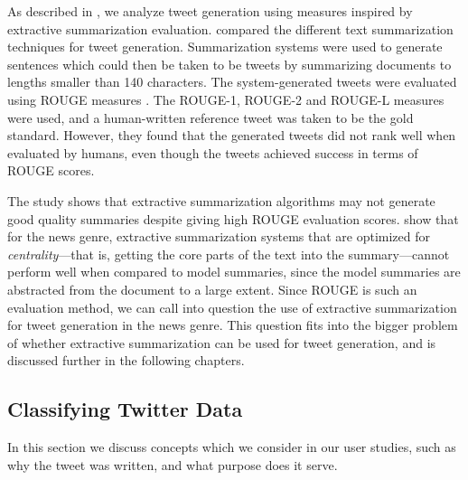 As described in , we analyze tweet generation using measures inspired by extractive summarization evaluation. \cite{lloret2013towards} compared the different text summarization techniques for tweet generation. Summarization systems were used to generate sentences which could then be taken to be tweets by summarizing documents to lengths smaller than 140 characters. The system-generated tweets were evaluated using ROUGE measures \citep{lin2004rouge}. The ROUGE-1, ROUGE-2 and ROUGE-L measures were used, and a human-written reference tweet was taken to be the gold standard. However, they found that the generated tweets did not rank well when evaluated by humans, even though the tweets achieved success in terms of ROUGE scores. %

The \cite{lloret2013towards} study shows that extractive summarization algorithms may not generate good quality summaries despite giving high ROUGE evaluation scores. \cite{cheung2013towards} show that for the news genre, extractive summarization systems that are optimized for \textit{centrality}---that is, getting the core parts of the text into the summary---cannot perform well when compared to model summaries, since the model summaries are abstracted from the document to a large extent. Since ROUGE is such an evaluation method, we can call into question the use of extractive summarization for tweet generation in the news genre. This question fits into the bigger problem of whether extractive summarization can be used for tweet generation, and is discussed further in the following chapters.

\subsection{Classifying Twitter Data}
\label{sec:related_user}

In this section we discuss concepts which we consider in our user studies, such as why the tweet was written, and what purpose does it serve.

